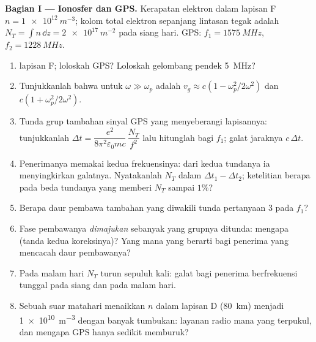 \begin{problem}
\label{pb:b2:waves-in-media:1}

\medskip
\noindent\textbf{Bagian I --- Ionosfer dan GPS.}
Kerapatan elektron dalam lapisan F $n = \qty{1e12}{m^{-3}}$; kolom total
elektron sepanjang lintasan tegak adalah $N_T = \int n\,\dd z = \qty{2e17}{m^{-2}}$ pada
siang hari. GPS: $f_1 = \qty{1575}{MHz}$, $f_2 = \qty{1228}{MHz}$.
\begin{enumerate}
  \item {} lapisan F; loloskah GPS? Loloskah
        gelombang pendek \qty{5}{MHz}?
  \item Tunjukkanlah bahwa untuk $\omega \gg \omega_p$  adalah $v_g \approx c(1 -
        \omega_p^2/2\omega^2)$ dan  $c(1 + \omega_p^2/2\omega^2)$.
  \item Tunda grup tambahan sinyal GPS yang menyeberangi lapisannya: tunjukkanlah
        $\Delta t = \dfrac{e^2}{8\pi^2\varepsilon_0mc}\,\dfrac{N_T}{f^2}$ lalu hitunglah bagi
        $f_1$; galat jaraknya $c\,\Delta t$.
  \item Penerimanya memakai kedua frekuensinya: dari kedua tundanya ia
        menyingkirkan galatnya. Nyatakanlah $N_T$ dalam $\Delta t_1 - \Delta t_2$;
        ketelitian berapa pada beda tundanya yang memberi $N_T$ sampai $1\%$?
  \item Berapa daur pembawa tambahan yang diwakili tunda pertanyaan 3
        pada $f_1$?
  \item Fase pembawanya \emph{dimajukan} sebanyak yang grupnya
        ditunda: mengapa (tanda kedua koreksinya)? Yang mana yang
        berarti bagi penerima yang mencacah daur pembawanya?
  \item Pada malam hari $N_T$ turun sepuluh kali: galat bagi penerima
        berfrekuensi tunggal pada siang dan pada malam hari.
  \item Sebuah suar matahari menaikkan $n$ dalam lapisan D (\qty{80}{km}) menjadi
        \qty{1e10}{m^{-3}} dengan banyak tumbukan: layanan radio mana yang
        terpukul, dan mengapa GPS hanya sedikit memburuk?
\end{enumerate}


\end{problem}
